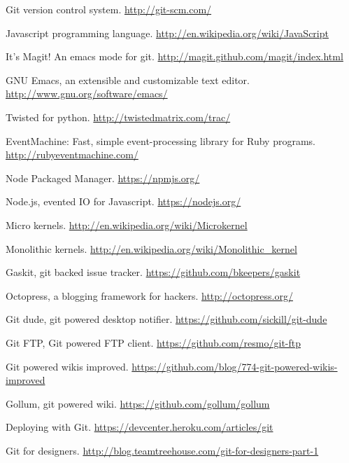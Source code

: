 \cleardoublepage
{}
{}
\begin{thebibliography}{99}

 Git version control system.
  \url{http://git-scm.com/}

 Javascript programming language.
  \url{http://en.wikipedia.org/wiki/JavaScript}

 It's Magit! An emacs mode for git.
  \url{http://magit.github.com/magit/index.html}

 GNU Emacs, an extensible and customizable text editor.
  \url{http://www.gnu.org/software/emacs/}

 Twisted for python.
  \url{http://twistedmatrix.com/trac/}

 EventMachine: Fast, simple event-processing library for
  Ruby programs. \url{http://rubyeventmachine.com/}

 Node Packaged Manager.
  \url{https://npmjs.org/}

 Node.js, evented IO for Javascript.
  \url{https://nodejs.org/}

 Micro kernels.
  \url{http://en.wikipedia.org/wiki/Microkernel}

 Monolithic kernels.
  \url{http://en.wikipedia.org/wiki/Monolithic_kernel}

 Gaskit, git backed issue tracker.
  \url{https://github.com/bkeepers/gaskit}

 Octopress, a blogging framework for hackers.
  \url{http://octopress.org/}

 Git dude, git powered desktop notifier.
  \url{https://github.com/sickill/git-dude}

 Git FTP, Git powered FTP client.
  \url{https://github.com/resmo/git-ftp}

 Git powered wikis improved.
  \url{https://github.com/blog/774-git-powered-wikis-improved}

 Gollum, git powered wiki.
  \url{https://github.com/gollum/gollum}

 Deploying with Git.
  \url{https://devcenter.heroku.com/articles/git}

 Git for designers.
  \url{http://blog.teamtreehouse.com/git-for-designers-part-1}


\end{thebibliography}
